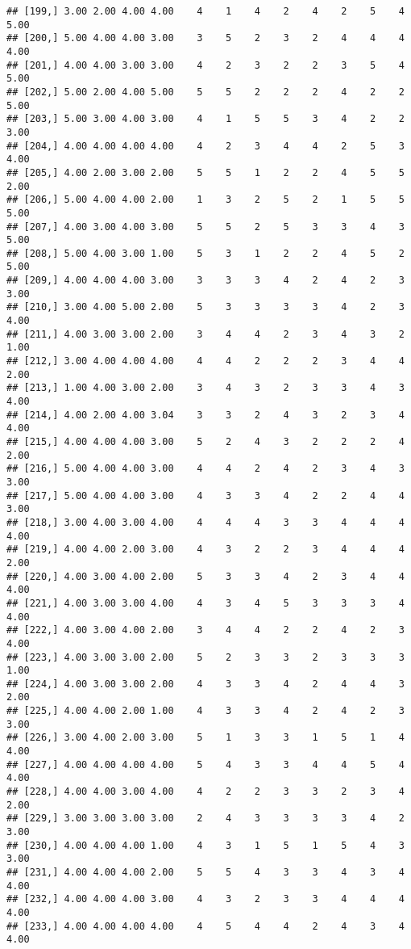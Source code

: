 \documentclass[]{article}
\begin{document}
\begin{verbatim}
## [199,] 3.00 2.00 4.00 4.00    4    1    4    2    4    2    5    4 5.00
## [200,] 5.00 4.00 4.00 3.00    3    5    2    3    2    4    4    4 4.00
## [201,] 4.00 4.00 3.00 3.00    4    2    3    2    2    3    5    4 5.00
## [202,] 5.00 2.00 4.00 5.00    5    5    2    2    2    4    2    2 5.00
## [203,] 5.00 3.00 4.00 3.00    4    1    5    5    3    4    2    2 3.00
## [204,] 4.00 4.00 4.00 4.00    4    2    3    4    4    2    5    3 4.00
## [205,] 4.00 2.00 3.00 2.00    5    5    1    2    2    4    5    5 2.00
## [206,] 5.00 4.00 4.00 2.00    1    3    2    5    2    1    5    5 5.00
## [207,] 4.00 3.00 4.00 3.00    5    5    2    5    3    3    4    3 5.00
## [208,] 5.00 4.00 3.00 1.00    5    3    1    2    2    4    5    2 5.00
## [209,] 4.00 4.00 4.00 3.00    3    3    3    4    2    4    2    3 3.00
## [210,] 3.00 4.00 5.00 2.00    5    3    3    3    3    4    2    3 4.00
## [211,] 4.00 3.00 3.00 2.00    3    4    4    2    3    4    3    2 1.00
## [212,] 3.00 4.00 4.00 4.00    4    4    2    2    2    3    4    4 2.00
## [213,] 1.00 4.00 3.00 2.00    3    4    3    2    3    3    4    3 4.00
## [214,] 4.00 2.00 4.00 3.04    3    3    2    4    3    2    3    4 4.00
## [215,] 4.00 4.00 4.00 3.00    5    2    4    3    2    2    2    4 2.00
## [216,] 5.00 4.00 4.00 3.00    4    4    2    4    2    3    4    3 3.00
## [217,] 5.00 4.00 4.00 3.00    4    3    3    4    2    2    4    4 3.00
## [218,] 3.00 4.00 3.00 4.00    4    4    4    3    3    4    4    4 4.00
## [219,] 4.00 4.00 2.00 3.00    4    3    2    2    3    4    4    4 2.00
## [220,] 4.00 3.00 4.00 2.00    5    3    3    4    2    3    4    4 4.00
## [221,] 4.00 3.00 3.00 4.00    4    3    4    5    3    3    3    4 4.00
## [222,] 4.00 3.00 4.00 2.00    3    4    4    2    2    4    2    3 4.00
## [223,] 4.00 3.00 3.00 2.00    5    2    3    3    2    3    3    3 1.00
## [224,] 4.00 3.00 3.00 2.00    4    3    3    4    2    4    4    3 2.00
## [225,] 4.00 4.00 2.00 1.00    4    3    3    4    2    4    2    3 3.00
## [226,] 3.00 4.00 2.00 3.00    5    1    3    3    1    5    1    4 4.00
## [227,] 4.00 4.00 4.00 4.00    5    4    3    3    4    4    5    4 4.00
## [228,] 4.00 4.00 3.00 4.00    4    2    2    3    3    2    3    4 2.00
## [229,] 3.00 3.00 3.00 3.00    2    4    3    3    3    3    4    2 3.00
## [230,] 4.00 4.00 4.00 1.00    4    3    1    5    1    5    4    3 3.00
## [231,] 4.00 4.00 4.00 2.00    5    5    4    3    3    4    3    4 4.00
## [232,] 4.00 4.00 4.00 3.00    4    3    2    3    3    4    4    4 4.00
## [233,] 4.00 4.00 4.00 4.00    4    5    4    4    2    4    3    4 4.00

\end{verbatim}
\end{document}
